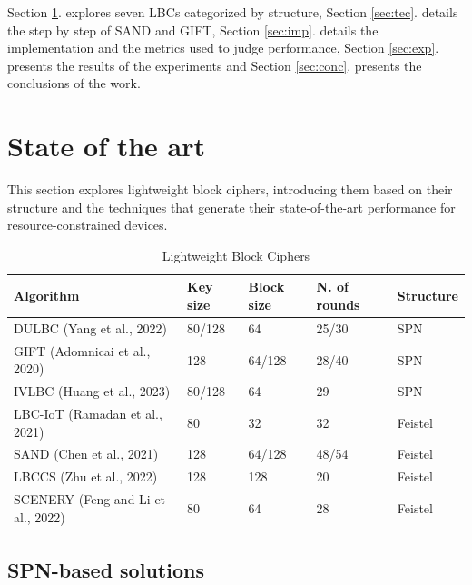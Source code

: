 \documentclass[conference]{IEEEtran}
\begin{document}
Section \ref{sec:art}. explores seven LBCs categorized by structure, 
Section \ref{sec:tec}. details the step by step of SAND and GIFT, 
Section \ref{sec:imp}. details the implementation and the metrics used to judge performance, 
Section \ref{sec:exp}. presents the results of the experiments and  
Section \ref{sec:conc}. presents the conclusions of the work.

\section{State of the art}\label{sec:art}

This section explores lightweight block ciphers, introducing them based on their structure and the techniques that generate their state-of-the-art performance for resource-constrained devices.

\begin{table}[ht]
  \centering
  \caption{Lightweight Block Ciphers}
  \begin{tabular}{lllll} 
   \toprule
   Algorithm & Key size & Block size & N. of rounds & Structure \\ 
   \midrule
   DULBC (Yang et al., 2022) \cite{DULBC} & 80/128 & 64 & 25/30 & SPN \\
   GIFT (Adomnicai et al., 2020)\cite{GIFT}\cite{adomnicai2020fixslicing} & 128 & 64/128 & 28/40 & SPN \\
   IVLBC (Huang et al., 2023)\cite{IVLBC} & 80/128 & 64 & 29 & SPN \\
   LBC-IoT (Ramadan et al., 2021)\cite{LBC-IoT} & 80 & 32 & 32 & Feistel  \\
   SAND (Chen et al., 2021)\cite{SAND} & 128 & 64/128 & 48/54 & Feistel \\
   LBCCS (Zhu et al., 2022)\cite{LBCCS} & 128 & 128 & 20 & Feistel \\
   SCENERY (Feng and Li et al., 2022)\cite{SCENERY} & 80 & 64 & 28 & Feistel  \\
   \bottomrule
  \end{tabular}
  \label{table:ciphers}
\end{table}

\subsection{SPN-based solutions}
\end{document}
